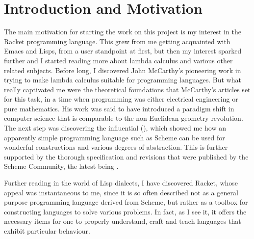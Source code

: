 
\chapter*{Introduction and Motivation}
\pagestyle{plain}                       %

\indent\indent The main motivation for starting the work on this project is my interest
in the Racket programming language. This grew from me getting acquainted
with Emacs and Lisps, from a user standpoint at first, but then my interest
sparked further and I started reading more about lambda calculus and various other
related subjects. Before long, I discovered John McCarthy's pioneering
work in trying to make lambda calculus suitable for programming languages.
But what really captivated me were the theoretical foundations that
McCarthy's articles \cite{mccarthy60, mccarthy61, mccarthy62} set for this
task, in a time when programming was either electrical engineering or
pure mathematics. His work was said to have introduced a paradigm shift
in computer science that is comparable to the non-Euclidean geometry
revolution. The next step was discovering the influential 
(\cite{sicp}), which showed me how an apparently simple programming
language such as Scheme can be used for wonderful constructions and
various degrees of abstraction. This is further supported by the
thorough specification and revisions that were published by the
Scheme Community, the latest being \cite{r7rs}.

Further reading in the world of Lisp dialects, I have discovered Racket,
whose appeal was instantaneous to me, since it is so often described not
as a general purpose programming language derived from Scheme\footnotemark,
but rather as a toolbox for constructing languages to solve various
problems. In fact, as I see it, it offers the necessary items for one to
properly understand, craft and teach languages that exhibit particular
behaviour.


